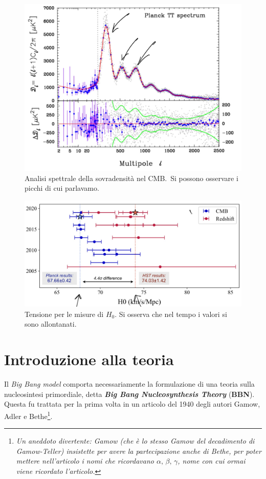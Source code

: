 \begin{itemize}
    \begin{figure}[h]
        \centering
        \includegraphics[scale=0.2]{Immagini/0311_peak.png}
        \caption{Analisi spettrale della sovradensità nel CMB.\ Si possono osservare i picchi di cui parlavamo.}
        \label{0311_peak}
    \end{figure}
    \begin{figure}[h]
        \centering
        \includegraphics[scale=0.2]{Immagini/0311_peak2.png}
        \caption{Tensione per le misure di $H_0$. Si osserva che nel tempo i valori si sono allontanati.}
        \label{0311_H0}
    \end{figure}
\end{itemize}


\section{Introduzione alla teoria}
Il \textit{Big Bang model} comporta necessariamente la formulazione di una teoria sulla nucleosintesi primordiale, detta \textit{\textbf{Big Bang Nucleosynthesis Theory}} (\textbf{BBN}). Questa fu trattata per la prima volta in un articolo del 1940 degli autori Gamow, Adler e Bethe\footnote{\itshape Un aneddoto divertente: Gamow (che è lo stesso Gamow del decadimento di Gamow-Teller) insistette per avere la partecipazione anche di Bethe, per poter mettere nell'articolo i nomi  che ricordavano $\alpha,\,\beta,\,\gamma$, nome con cui ormai viene ricordato l'articolo.}.

